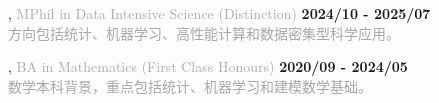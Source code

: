 , \textcolor{darkgray}{MPhil in Data Intensive Science (Distinction)} \hfill \textbf{2024/10 - 2025/07}\\

\textcolor{darkgray}{方向包括统计、机器学习、高性能计算和数据密集型科学应用。}
\vspace{0.2em}

, \textcolor{darkgray}{BA in Mathematics (First Class Honours) \hfill} \textbf{2020/09 - 2024/05}\\

\textcolor{darkgray}{数学本科背景，重点包括统计、机器学习和建模数学基础。}
